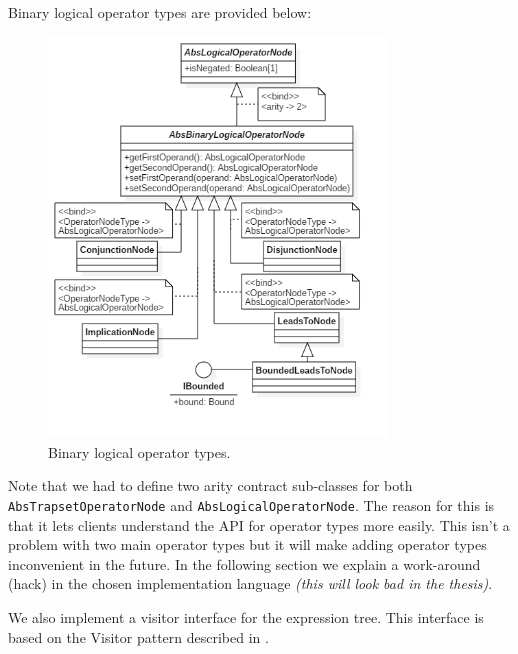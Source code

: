 \documentclass[12pt,oneside,a4paper,notitlepage]{report}
\begin{document}
	\newpage

	\par Binary logical operator types are provided below:

	\begin{figure}[h]
		\begin{center}
			\includegraphics[width=0.8\textwidth]
			{Models/LogicalOperatorTypesBinary}
		\end{center}
		\caption{Binary logical operator types.}
		\label{fig:binary-logical-types}
	\end{figure}

	\newpage

	\par Note that we had to define two arity contract sub-classes for both\\
	\texttt{AbsTrapsetOperatorNode} and \texttt{AbsLogicalOperatorNode}. The reason for this is that it lets clients understand the API for operator types more easily. This isn't a problem with two main operator types but it will make adding operator types inconvenient in the future. In the following section we explain a work-around (hack) in the chosen implementation language \textit{(this will look bad in the thesis)}.

	\bigskip

	\par We also implement a visitor interface for the expression tree. This interface is based on the Visitor pattern described in \cite{patternbook}.
\end{document}
